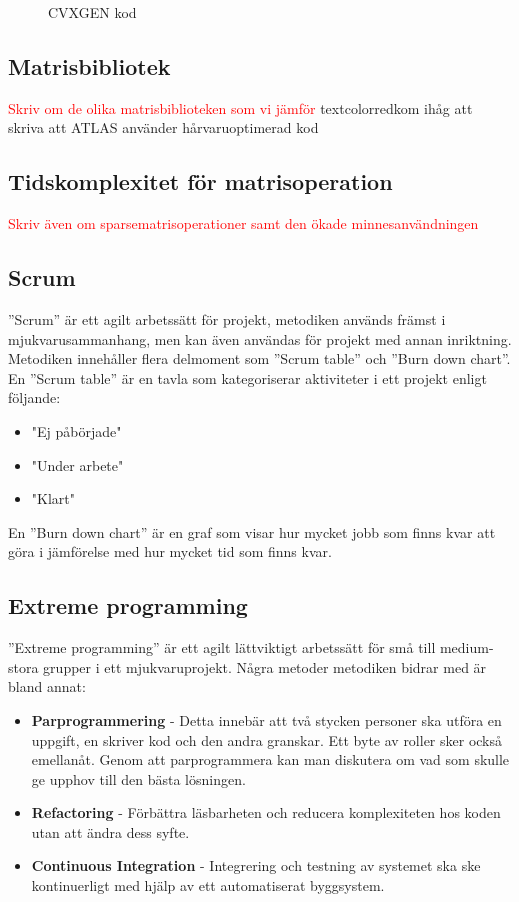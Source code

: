\begin{figure}[H]

\caption{CVXGEN kod \citep{cvxgen2}}
\label{fig:cvxgen}
\end{figure}  


\subsection{Matrisbibliotek}
\textcolor{red}{Skriv om de olika matrisbiblioteken som vi jämför}
textcolor{red}{kom ihåg att skriva att ATLAS använder hårvaruoptimerad kod}

\subsection{Tidskomplexitet för matrisoperation}
\textcolor{red}{Skriv även om sparsematrisoperationer samt den ökade minnesanvändningen}
\subsection{Scrum}
''Scrum'' är ett agilt arbetssätt för projekt, metodiken används främst i mjukvarusammanhang, men kan även användas för projekt med annan inriktning. Metodiken innehåller flera delmoment som ''Scrum table'' och ''Burn down chart''. En ''Scrum table'' är en tavla som kategoriserar aktiviteter i ett projekt enligt följande: 
\begin{itemize}
  \item "Ej påbörjade"
  \item "Under arbete"
  \item "Klart"
\end{itemize} 
En ''Burn down chart'' är en graf som visar hur mycket jobb som finns kvar att göra i jämförelse med hur mycket tid som finns kvar. \citep{scrum}

\subsection{Extreme programming}
''Extreme programming'' är ett agilt lättviktigt arbetssätt för små till medium-stora grupper i ett mjukvaruprojekt. Några metoder metodiken bidrar med är bland annat:     
\begin{itemize}
\item \textbf{Parprogrammering} - Detta innebär att två stycken personer ska utföra en uppgift, en skriver kod och den andra granskar. Ett byte av roller sker också emellanåt. Genom att parprogrammera kan man diskutera om vad som skulle ge upphov till den bästa lösningen. 
\item \textbf{Refactoring} - Förbättra läsbarheten och reducera komplexiteten hos koden utan att ändra dess syfte.
\item \textbf{Continuous Integration} - Integrering och testning av systemet ska ske kontinuerligt med hjälp av ett automatiserat byggsystem. 
\end{itemize}
\citep{kristiansandahl}
